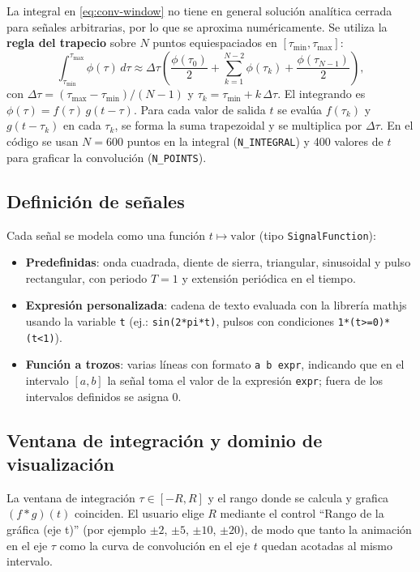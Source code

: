 \documentclass[12pt,a4paper]{article}
\begin{document}
La integral en \eqref{eq:conv-window} no tiene en general solución analítica cerrada para señales arbitrarias, por lo que se aproxima numéricamente. Se utiliza la \textbf{regla del trapecio} sobre \(N\) puntos equiespaciados en \([\tau_{\min}, \tau_{\max}]\):
\begin{equation}
  \int_{\tau_{\min}}^{\tau_{\max}} \phi(\tau)\, d\tau
  \approx \Delta\tau \left( \frac{\phi(\tau_0)}{2} + \sum_{k=1}^{N-2} \phi(\tau_k) + \frac{\phi(\tau_{N-1})}{2} \right),
\end{equation}
con \(\Delta\tau = (\tau_{\max} - \tau_{\min})/(N-1)\) y \(\tau_k = \tau_{\min} + k\,\Delta\tau\). El integrando es \(\phi(\tau) = f(\tau)\,g(t-\tau)\). Para cada valor de salida \(t\) se evalúa \(f(\tau_k)\) y \(g(t - \tau_k)\) en cada \(\tau_k\), se forma la suma trapezoidal y se multiplica por \(\Delta\tau\). En el código se usan \(N = 600\) puntos en la integral (\texttt{N\_INTEGRAL}) y 400 valores de \(t\) para graficar la convolución (\texttt{N\_POINTS}).

\subsection{Definición de señales}

Cada señal se modela como una función \(t \mapsto \text{valor}\) (tipo \texttt{SignalFunction}):
\begin{itemize}
  \item \textbf{Predefinidas}: onda cuadrada, diente de sierra, triangular, sinusoidal y pulso rectangular, con periodo \(T=1\) y extensión periódica en el tiempo.
  \item \textbf{Expresión personalizada}: cadena de texto evaluada con la librería mathjs usando la variable \texttt{t} (ej.: \texttt{sin(2*pi*t)}, pulsos con condiciones \texttt{1*(t>=0)*(t<1)}).
  \item \textbf{Función a trozos}: varias líneas con formato \texttt{a b expr}, indicando que en el intervalo \([a,b]\) la señal toma el valor de la expresión \texttt{expr}; fuera de los intervalos definidos se asigna 0.
\end{itemize}

\subsection{Ventana de integración y dominio de visualización}

La ventana de integración \(\tau \in [-R, R]\) y el rango donde se calcula y grafica \((f*g)(t)\) coinciden. El usuario elige \(R\) mediante el control ``Rango de la gráfica (eje t)'' (por ejemplo \(\pm 2\), \(\pm 5\), \(\pm 10\), \(\pm 20\)), de modo que tanto la animación en el eje \(\tau\) como la curva de convolución en el eje \(t\) quedan acotadas al mismo intervalo.
\end{document}
